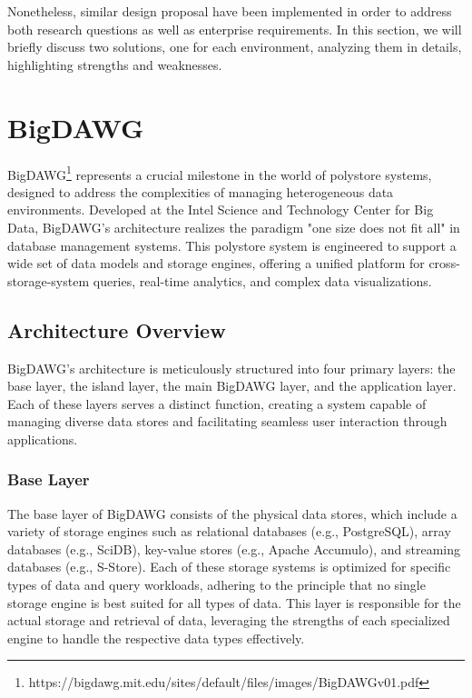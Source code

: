 Nonetheless, similar design proposal have been implemented in order to address both research questions as well as enterprise requirements. In this section, we will briefly discuss two solutions, one for each environment, analyzing them in details, highlighting strengths and weaknesses.

\section{BigDAWG}
\ac{BigDAWG}\footnote{https://bigdawg.mit.edu/sites/default/files/images/BigDAWGv01.pdf} \cite{DBLP:conf/hpec/GadepallyCDEHKM16} represents a crucial milestone in the world of polystore systems, designed to address the complexities of managing heterogeneous data environments. Developed at the Intel Science and Technology Center for Big Data, \ac{BigDAWG}'s architecture realizes the paradigm "one size does not fit all" in database management systems. This polystore system is engineered to support a wide set of data models and storage engines, offering a unified platform for cross-storage-system queries, real-time analytics, and complex data visualizations.
\subsection{Architecture Overview}
\ac{BigDAWG}'s architecture is meticulously structured into four primary layers: the base layer, the island layer, the main \ac{BigDAWG} layer, and the application layer. Each of these layers serves a distinct function, creating a system capable of managing diverse data stores and facilitating seamless user interaction through applications.
\subsubsection{Base Layer}
The base layer of \ac{BigDAWG} consists of the physical data stores, which include a variety of storage engines such as relational databases (e.g., PostgreSQL), array databases (e.g., SciDB), key-value stores (e.g., Apache Accumulo), and streaming databases (e.g., S-Store). Each of these storage systems is optimized for specific types of data and query workloads, adhering to the principle that no single storage engine is best suited for all types of data. This layer is responsible for the actual storage and retrieval of data, leveraging the strengths of each specialized engine to handle the respective data types effectively.
